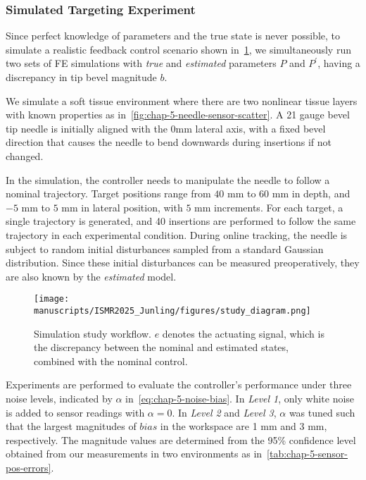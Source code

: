 \subsubsection{Simulated Targeting Experiment}
\label{sec:chap-5-sim-target-experiment}
Since perfect knowledge of parameters and the true state is never possible, to simulate a realistic feedback control scenario shown in~\cref{fig:chap-5-simulator-diagram}, we simultaneously run two sets of FE simulations with \textit{true} and \textit{estimated} parameters $P$ and $P^\prime$, having a discrepancy in tip bevel magnitude $b$. 

We simulate a soft tissue environment where there are two nonlinear tissue layers with known properties as in~\cref{fig:chap-5-needle-sensor-scatter}. A 21 gauge bevel tip needle is initially aligned with the $0$mm lateral axis, with a fixed bevel direction that causes the needle to bend downwards during insertions if not changed. 

In the simulation, the controller needs to manipulate the needle to follow a nominal trajectory.  Target positions range from $40$ mm to $60$ mm in depth, and $-5$ mm to $5$ mm in lateral position, with $5$ mm increments. For each target, a single trajectory is generated, and 40 insertions are performed to follow the same trajectory in each experimental condition. During online tracking, the needle is subject to random initial disturbances sampled from a standard Gaussian distribution. Since these initial disturbances can be measured preoperatively, they are also known by the \textit{estimated} model.

\begin{figure}[ht]
  \centering
  \texttt{[image: manuscripts/ISMR2025\_Junling/figures/study\_diagram.png]}
  \caption{Simulation study workflow. $e$ denotes the actuating signal, which is the discrepancy between the nominal and estimated states, combined with the nominal control.}
  \label{fig:chap-5-simulator-diagram}
\end{figure}

Experiments are performed to evaluate the controller's performance under three noise levels, indicated by $\alpha$ in~\cref{eq:chap-5-noise-bias}. In \textit{Level 1}, only white noise is added to sensor readings with $\alpha = 0$. In \textit{Level 2} and \textit{Level 3}, $\alpha$ was tuned such that the largest magnitudes of $bias$ in the workspace are 1 mm and 3 mm, respectively. The magnitude values are determined from the 95\% confidence level obtained from our measurements in two environments as in~\cref{tab:chap-5-sensor-pos-errors}.

